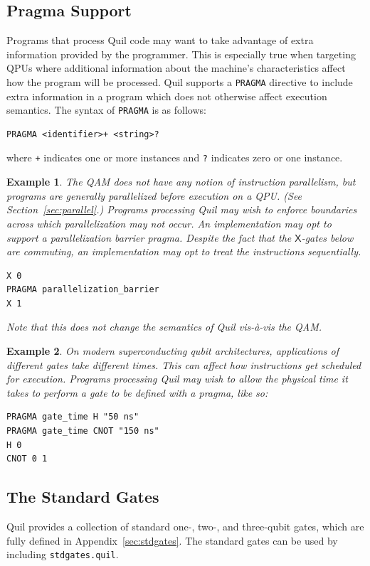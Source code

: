\documentclass[conference]{IEEEtran}
\newtheorem{example}{Example}
\begin{document}
\subsection{Pragma Support}
Programs that process Quil code may want to take advantage of extra information provided by the programmer. This is especially true when targeting QPUs where additional information about the machine's characteristics affect how the program will be processed. Quil supports a \verb|PRAGMA| directive to include extra information in a program which does not otherwise affect execution semantics. The syntax of \verb|PRAGMA| is as follows:
\begin{verbatim}
PRAGMA <identifier>+ <string>?
\end{verbatim}
where \verb|+| indicates one or more instances and \verb|?| indicates zero or one instance.
\begin{example}
The QAM does not have any notion of instruction parallelism, but programs are generally parallelized before execution on a QPU. (See Section~\ref{sec:parallel}.) Programs processing Quil may wish to enforce boundaries across which parallelization may not occur. An implementation may opt to support a parallelization barrier pragma. Despite the fact that the $\mathsf{X}$-gates below are commuting, an implementation may opt to treat the instructions sequentially.
\begin{verbatim}
X 0
PRAGMA parallelization_barrier
X 1
\end{verbatim}
Note that this does not change the semantics of Quil vis-\`a-vis the QAM.
\end{example}
\begin{example}
On modern superconducting qubit architectures, applications of different gates take different times. This can affect how instructions get scheduled for execution. Programs processing Quil may wish to allow the physical time it takes to perform a gate to be defined with a pragma, like so:
\begin{verbatim}
PRAGMA gate_time H "50 ns"
PRAGMA gate_time CNOT "150 ns"
H 0
CNOT 0 1
\end{verbatim}
\end{example}

\subsection{The Standard Gates}
Quil provides a collection of standard one-, two-, and three-qubit gates, which are fully defined in Appendix~\ref{sec:stdgates}. The standard gates can be used by including \verb|stdgates.quil|.
\end{document}
